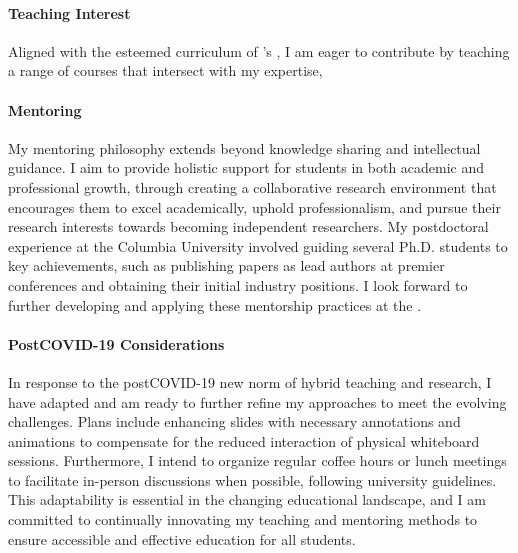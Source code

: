 \paragraph{Teaching Interest}
Aligned with the esteemed curriculum of \appSchool{}'s \appDept{}, I am eager to contribute by teaching a range of courses that intersect with my expertise,
\rsCustom{}

\paragraph{Mentoring}
My mentoring philosophy extends beyond knowledge sharing and intellectual guidance. I aim to provide holistic support for students in both academic and professional growth, through creating a collaborative research environment that encourages them to excel academically, uphold professionalism, and pursue their research interests towards becoming independent researchers. My postdoctoral experience at the Columbia University involved guiding several Ph.D. students to key achievements, such as publishing papers as lead authors at premier conferences and obtaining their initial industry positions. I look forward to further developing and applying these mentorship practices at the \appSchool{}.

\paragraph{Post\textendash COVID-19 Considerations}

In response to the post\textendash COVID-19 new norm of hybrid teaching and research, I have adapted and am ready to further refine my approaches to meet the evolving challenges. Plans include enhancing slides with necessary annotations and animations to compensate for the reduced interaction of physical whiteboard sessions. Furthermore, I intend to organize regular coffee hours or lunch meetings to facilitate in-person discussions when possible, following university guidelines. This adaptability is essential in the changing educational landscape, and I am committed to continually innovating my teaching and mentoring methods to ensure accessible and effective education for all students.